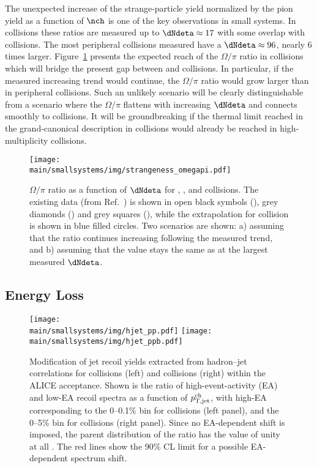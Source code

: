 \documentclass[../report.tex]{subfiles}
\providecommand{\main}{..}
\begin{document}
The unexpected increase of the strange-particle yield normalized by the pion yield as a function of $\nch$ is one of the key observations in small systems. In \pp collisions these ratios are measured up to $\dNdeta \approx 17$ with some overlap with \pPb collisions. The most peripheral \PbPb collisions measured have a $\dNdeta \approx 96$, nearly 6 times larger. Figure~\ref{fig:smallsystems_strangeness_omega_pi} presents the expected reach of the $\Omega/\pi$ ratio in \pp collisions which will bridge the present gap between \pp and \PbPb collisions. In particular, if the measured increasing trend would continue, the $\Omega/\pi$ ratio would grow larger than in peripheral \PbPb collisions. Such an unlikely scenario will be clearly distinguishable from a scenario where the $\Omega/\pi$ flattens with increasing $\dNdeta$ and connects smoothly to \PbPb collisions. It will be groundbreaking if the thermal limit reached in the grand-canonical description in \PbPb collisions would already be reached in high-multiplicity \pp collisions.

\begin{figure}[t]
\centering
\texttt{[image: \\main/smallsystems/img/strangeness\_omegapi.pdf]}

\caption{$\Omega/\pi$ ratio as a function of $\dNdeta$ for \pp, \pPb, and \PbPb collisions. The existing data (from Ref.~\cite{ALICE:2017jyt}) is shown in open black symbols (\pp), grey diamonds (\pPb) and grey squares (\PbPb), while the extrapolation for \pp collision is shown in blue filled circles. Two scenarios are shown: a) assuming that the ratio continues increasing following the measured trend, and b) assuming that the value stays the same as at the largest measured $\dNdeta$.}
\label{fig:smallsystems_strangeness_omega_pi}
\end{figure}

\subsection{Energy Loss}
\label{sect:smallsystems_energyloss}

\begin{figure}[t]
\centering
\texttt{[image: \\main/smallsystems/img/hjet\_pp.pdf]}
\hfill
\texttt{[image: \\main/smallsystems/img/hjet\_ppb.pdf]}
\caption{Modification of jet recoil yields extracted from hadron--jet correlations for \pp collisions (left) and \pPb collisions (right) within the ALICE acceptance. Shown is the ratio  of high-event-activity (EA) and low-EA recoil spectra as a function of $p_{\rm T,jet}^{\rm ch}$, with high-EA corresponding to the  0--0.1\% bin for \pp collisions (left panel), and the 0--5\% bin for \pPb collisions (right panel). Since no EA-dependent shift is imposed, the parent distribution of the ratio has the value of unity at all \pT. The red lines show the 90\% CL limit for a possible EA-dependent spectrum shift.}
\label{fig:smallsystems_energyloss_hjet}
\end{figure}
\end{document}
